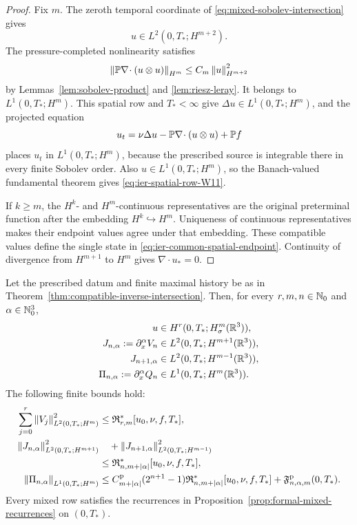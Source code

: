 \begin{proof}
Fix \(m\).  The zeroth temporal coordinate of
\eqref{eq:mixed-sobolev-intersection} gives
\[
 u\in L^2(0,T_*;H^{m+2}).
\]
The pressure-completed nonlinearity satisfies
\[
 \left\lVert \mathbb P\nabla\!\cdot(u\otimes u)\right\rVert_{H^m}
 \le C_m\left\lVert u\right\rVert_{H^{m+2}}^2
\]
by Lemmas~\ref{lem:sobolev-product} and \ref{lem:riesz-leray}.  It belongs
to \(L^1(0,T_*;H^m)\).  This spatial row and \(T_*<\infty\) give
 \(\Delta u\in L^1(0,T_*;H^m)\), and the projected equation
\[
 u_t=\nu\Delta u-\mathbb P\nabla\!\cdot(u\otimes u)+\mathbb P f
\]
places \(u_t\) in \(L^1(0,T_*;H^m)\), because the prescribed source is
integrable there in every finite Sobolev order.  Also
\(u\in L^1(0,T_*;H^m)\), so the Banach-valued fundamental theorem gives
\eqref{eq:ier-spatial-row-W11}.

If \(k\ge m\), the \(H^k\)- and \(H^m\)-continuous representatives are
the original preterminal function after the embedding \(H^k\hookrightarrow
H^m\).  Uniqueness of continuous representatives makes their endpoint
values agree under that embedding.  These compatible values define the
single state in \eqref{eq:ier-common-spatial-endpoint}.  Continuity of
divergence from \(H^{m+1}\) to \(H^m\) gives \(\nabla\cdot u_*=0\).
\end{proof}

\begin{corollary}
\label{cor:ier-whole-terminal-mixed-jet}
Let the prescribed datum and finite maximal history be as in
Theorem~\ref{thm:compatible-inverse-intersection}.  Then, for every
\(r,m,n\in\mathbb N_0\) and \(\alpha\in\mathbb N_0^3\),
\begin{align}
 u&\in H^r(0,T_*;H^m_\sigma(\mathbb R^3)),
 \label{eq:ier-whole-terminal-bochner}\\
 J_{n,\alpha}:=\partial_x^\alpha V_n
 &\in L^2(0,T_*;H^{m+1}(\mathbb R^3)),
 \label{eq:ier-whole-terminal-mixed-upper}\\
 J_{n+1,\alpha}
 &\in L^2(0,T_*;H^{m-1}(\mathbb R^3)),
 \label{eq:ier-whole-terminal-mixed-lower}\\
 \Pi_{n,\alpha}:=\partial_x^\alpha Q_n
 &\in L^1(0,T_*;H^m(\mathbb R^3)).
 \label{eq:ier-whole-terminal-mixed-pressure}
\end{align}
The following finite bounds hold:
\begin{align}
 \sum_{j=0}^{r}\left\lVert V_j\right\rVert_{L^2(0,T_*;H^m)}^2
 &\le\mathfrak R_{r,m}^*[u_0,\nu,f,T_*],
 \label{eq:ier-finite-bochner-bound}\\
 \left\lVert J_{n,\alpha}\right\rVert_{L^2(0,T_*;H^{m+1})}^2
 &\quad+\left\lVert J_{n+1,\alpha}\right\rVert_{L^2(0,T_*;H^{m-1})}^2
 \notag\\
 &\le\mathfrak R_{n,m+|\alpha|}^*[u_0,\nu,f,T_*],
 \label{eq:ier-finite-mixed-bound}\\
 \left\lVert \Pi_{n,\alpha}\right\rVert_{L^1(0,T_*;H^m)}
 &\le C_{m+|\alpha|}^{\rm p}(2^{n+1}-1)
 \mathfrak R_{n,m+|\alpha|}^*[u_0,\nu,f,T_*]
 +\mathfrak F^{\rm p}_{n,\alpha,m}(0,T_*).
 \label{eq:ier-finite-mixed-pressure-bound}
\end{align}
Every mixed row satisfies the recurrences in
Proposition~\ref{prop:formal-mixed-recurrences} on \((0,T_*)\).
\end{corollary}

